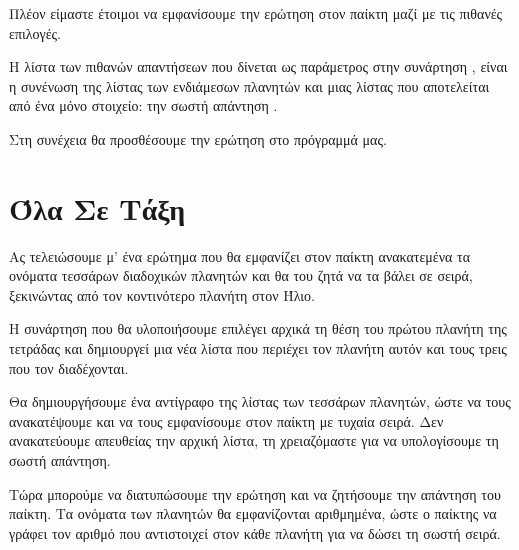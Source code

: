 \documentclass[a4paper,11pt,oneside]{book}
\begin{document}
Πλέον είμαστε έτοιμοι να εμφανίσουμε την ερώτηση στον παίκτη μαζί με τις πιθανές επιλογές.


Η λίστα των πιθανών απαντήσεων που δίνεται ως παράμετρος στην συνάρτηση , είναι η συνένωση της λίστας  των ενδιάμεσων πλανητών και μιας λίστας που αποτελείται από ένα μόνο στοιχείο: την σωστή απάντηση .

Στη συνέχεια θα προσθέσουμε την ερώτηση στο πρόγραμμά μας.


\section{Όλα Σε Τάξη}

\begin{question}
Ας τελειώσουμε μ' ένα ερώτημα που θα εμφανίζει στον παίκτη ανακατεμένα τα ονόματα τεσσάρων διαδοχικών πλανητών και θα του ζητά να τα βάλει σε σειρά, ξεκινώντας από τον κοντινότερο πλανήτη στον Ήλιο.
\end{question}

Η συνάρτηση που θα υλοποιήσουμε επιλέγει αρχικά τη θέση του πρώτου πλανήτη της τετράδας και δημιουργεί μια νέα λίστα που περιέχει τον πλανήτη αυτόν και τους τρεις που τον διαδέχονται.


Θα δημιουργήσουμε ένα αντίγραφο της λίστας των τεσσάρων πλανητών, ώστε να τους ανακατέψουμε και να τους εμφανίσουμε στον παίκτη με τυχαία σειρά. Δεν ανακατεύουμε απευθείας την αρχική λίστα, τη χρειαζόμαστε για να υπολογίσουμε τη σωστή απάντηση.


Τώρα μπορούμε να διατυπώσουμε την ερώτηση και να ζητήσουμε την απάντηση του παίκτη. Τα ονόματα των πλανητών θα εμφανίζονται αριθμημένα, ώστε ο παίκτης να γράφει τον αριθμό που αντιστοιχεί στον κάθε πλανήτη για να δώσει τη σωστή σειρά.

\end{document}

